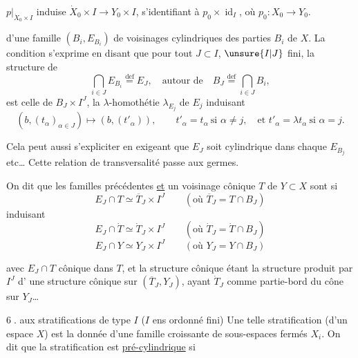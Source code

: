 $p|_{\dot X_0\times I}$ induise $\dot X_0\times I\longrightarrow Y_0\times I$,
s'identifiant à $p_0\times\operatorname{id}_I$, où $p_0:X_0\longrightarrow Y_0$.

 d'une famille 
$(B_i,E_{B_i})$ de voisinages cylindriques des parties $B_i$ de $X$.
La condition s'exprime en disant que pour
tout $J\subset I$, $\unsure{I|J}$ fini, la structure de
\[
\bigcap_{i\in J}E_{B_i}\overset{\mathrm{def}}=E_J,
\quad\text{autour de}\quad
B_J\overset{\mathrm{def}}=\bigcap_{i\in J}B_i,
\]
est celle de $B_J\times I^J$, la $\lambda$-homothétie
$\lambda_{E_j}$ de $E_j$  induisant
\[
(b,(t_\alpha)_{\alpha\in J})\longmapsto(b,(t'_\alpha)),
\qquad
t'_\alpha=t_\alpha\ \text{si }\alpha\ne j,\quad
\text{et }t'_\alpha=\lambda t_\alpha\ \text{si }\alpha=j.
\]

Cela peut aussi s'expliciter en exigeant
que $E_J$ soit cylindrique dans chaque $E_{B_j}$ etc\ldots
Cette relation de transversalité passe aux germes.

On dit que les familles précédentes \uline{et}
un voisinage cônique $T$ de $Y\subset X$ sont
 
si 
\[
E_J\cap T\simeq\overline T_J\times I^J
\qquad(\text{où }\overline T_J=T\cap B_J)
\]
induisant
\[
E_J\cap\dot T\simeq\dot T_J\times I^J
\qquad(\text{où }\dot T_J=\dot T\cap B_J)
\]
\[
E_J\cap Y\simeq Y_J\times I^J
\qquad(\text{où }Y_J=Y\cap B_J)
\]

avec $E_J\cap T$ cônique dans $T$, et la structure cônique
 étant la structure produit par $I^J$ d'
une structure cônique sur $(\overline T_J,Y_J)$, ayant
$\dot T_J$ comme partie-bord du cône sur $Y_J$\ldots


\textcircled{6.}  aux stratifications de type $I$
($I$ ens ordonné fini)
Une telle stratification (d'un espace $X$) est
la donnée d'une famille croissante de
sous-espaces fermés $X_i$. On dit que
la stratification est \uline{pré-cylindrique} si

